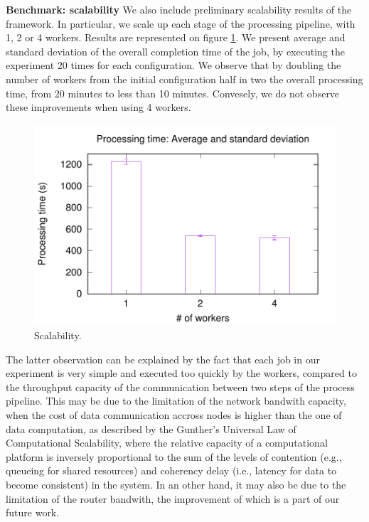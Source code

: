 \textbf{Benchmark: scalability}
We also include preliminary scalability results of the \SYS framework.
In particular, we scale up each stage of the processing pipeline, with 1, 2 or 4 workers.
Results are represented on figure \ref{fig:scalability}. 
We present average and standard deviation of the overall completion time of the job, by executing the experiment 20 times for each configuration.
We observe that by doubling the number of workers from the initial configuration half in two the overall processing time, from 20 minutes to less than 10 minutes.
Convesely, we do not observe these improvements when using 4 workers.

\begin{figure}[t!]
  \centering
  \includegraphics[scale=0.5]{images/avg_stdev_4_streams}
  \caption{Scalability.}
  \label{fig:scalability}
\end{figure}

The latter observation can be explained by the fact that each job in our experiment is very simple and executed too quickly by the workers, compared to the throughput capacity of the communication between two steps of the process pipeline.
This may be due to the limitation of the network bandwith capacity, when the cost of data communication accross nodes is higher than the one of data computation, as described by the Gunther's Universal Law of Computational Scalability\cite{gunther1993simple}, where the relative capacity of a computational platform is inversely proportional to the sum of the levels of contention (e.g., queueing for shared resources) and coherency delay (i.e., latency for data to become consistent) in the system.
In an other hand, it may also be due to the limitation of the router bandwith, the improvement of which is a part of our future work.
